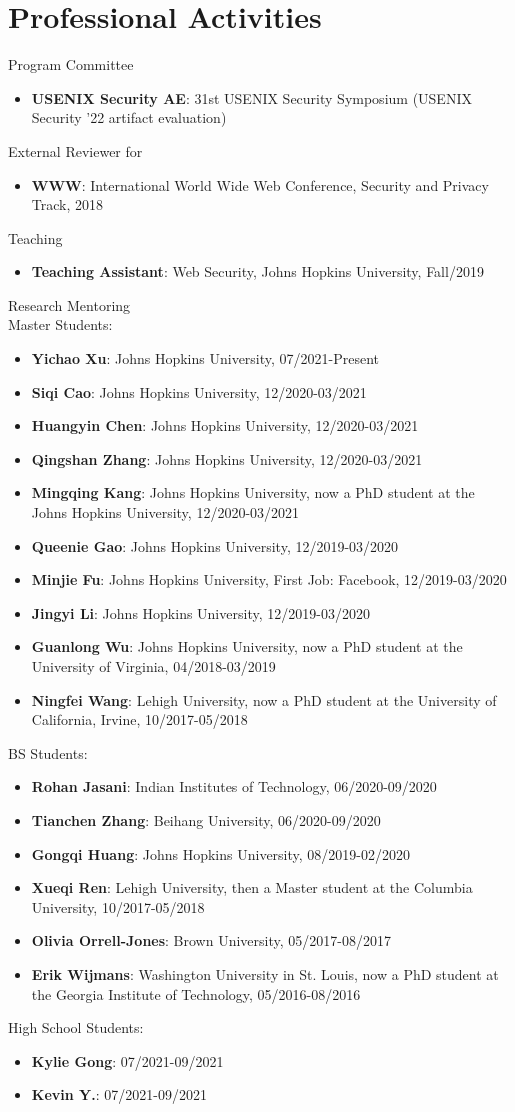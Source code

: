 \documentclass[letterpaper,11pt]{article}
\newcommand{\resumeItem}[2]{
  \item\small{
    \textbf{#1}{: #2 \vspace{-2pt}}
  }
}
\newcommand{\resumeItemListStart}{\begin{itemize}}
\newcommand{\resumeItemListEnd}{\end{itemize}\vspace{-5pt}}
\begin{document}
\section{Professional Activities}
Program Committee
\resumeItemListStart
\resumeItem{USENIX Security AE}{31st USENIX Security Symposium (USENIX Security '22 artifact evaluation)}
\resumeItemListEnd
External Reviewer for 
\resumeItemListStart
\resumeItem{WWW}{International World Wide Web Conference, Security and Privacy Track, 2018}    
\resumeItemListEnd	
Teaching
\resumeItemListStart
\resumeItem{Teaching Assistant}{Web Security, Johns Hopkins University, Fall/2019}
\resumeItemListEnd
Research Mentoring\\
	\quad Master Students:
    \resumeItemListStart
    \resumeItem{Yichao Xu}{ Johns Hopkins University, 07/2021-Present}
     \resumeItem{Siqi Cao}{Johns Hopkins University, 12/2020-03/2021}
    \resumeItem{Huangyin Chen}{Johns Hopkins University, 12/2020-03/2021}
    \resumeItem{Qingshan Zhang}{Johns Hopkins University, 12/2020-03/2021}
    \resumeItem{Mingqing Kang}{Johns Hopkins University, now a PhD student at the Johns Hopkins University, 12/2020-03/2021}
    \resumeItem{Queenie Gao}{Johns Hopkins University, 12/2019-03/2020}
    \resumeItem{Minjie Fu}{Johns Hopkins University, First Job: Facebook, 12/2019-03/2020}
    \resumeItem{Jingyi Li}{Johns Hopkins University, 12/2019-03/2020}
    \resumeItem{Guanlong Wu}{Johns Hopkins University, now a PhD student at the University of Virginia, 04/2018-03/2019}
    \resumeItem{Ningfei Wang}{Lehigh University, now a PhD student at the University of California, Irvine, 10/2017-05/2018}
    \resumeItemListEnd
\quad BS Students:
\resumeItemListStart	
	\resumeItem{Rohan Jasani}{Indian Institutes of Technology, 06/2020-09/2020}
	\resumeItem{Tianchen Zhang}{Beihang University, 06/2020-09/2020}
    \resumeItem{Gongqi Huang}{Johns Hopkins University, 08/2019-02/2020}
    \resumeItem{Xueqi Ren}{Lehigh University, then a Master student at the Columbia University, 10/2017-05/2018}    
    \resumeItem{Olivia Orrell-Jones}{Brown University, 05/2017-08/2017}	
    \resumeItem{Erik Wijmans}{Washington University in St. Louis, now a PhD student at the Georgia Institute of Technology, 05/2016-08/2016}	
	\resumeItemListEnd
\quad High School Students:
\resumeItemListStart	
    \resumeItem{Kylie Gong}{07/2021-09/2021}
	\resumeItem{Kevin Y.}{07/2021-09/2021}	
\resumeItemListEnd
\end{document}
